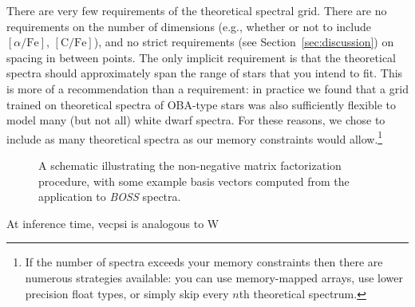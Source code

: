 \documentclass[modern]{aastex631}
\newcommand{\vecW}{\mathbf{W}}
\newcommand{\vecH}{\mathbf{H}}
\newcommand{\vecX}{\mathbf{X}}
\newcommand{\todo}[1]{\textcolor{tab:red}{#1}}
\begin{document}
There are very few requirements of the theoretical spectral grid. There are no requirements on the number of dimensions (e.g., whether or not to include $[\alpha/\mathrm{Fe}]$, $[\mathrm{C/Fe}]$), and no strict requirements (see Section~\ref{sec:discussion}) on spacing in between points. The only implicit requirement is that the theoretical spectra should approximately span the range of stars that you intend to fit. This is more of a recommendation than a requirement: in practice we found that a grid trained on theoretical spectra of OBA-type stars was also sufficiently flexible to model many (but not all) white dwarf spectra. For these reasons, we chose to include as many theoretical spectra as our memory constraints would allow.\footnote{If the number of spectra exceeds your memory constraints then there are numerous strategies available: you can use memory-mapped arrays, use lower precision float types, or simply skip every $n$th theoretical spectrum.}\\


\begin{figure*}
    \caption{A schematic illustrating the non-negative matrix factorization procedure, with some example basis vectors computed from the application to \emph{BOSS} spectra. \label{fig:schematic}}
\end{figure*}




\todo{At inference time, vecpsi is analogous to W}
\end{document}
